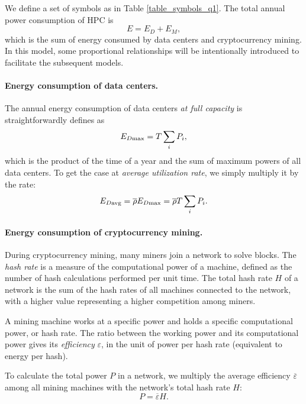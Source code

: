 \documentclass[12pt]{article}
\begin{document}
We define a set of symbols as in Table \ref{table_symbols_q1}. The total annual power consumption of HPC is
\begin{equation}
	E = E_D + E_M,
\end{equation}
which is the sum of energy consumed by data centers and cryptocurrency mining. In this model, some proportional relationships will be intentionally introduced to facilitate the subsequent models.

\paragraph{Energy consumption of data centers.} The annual energy consumption of data centers \textit{at full capacity} is straightforwardly defines as
\begin{equation}
	E_{D \rm max} = T \sum_i P_i,
\end{equation}
which is the product of the time of a year and the sum of maximum powers of all data centers. To get the case at \textit{average utilization rate}, we simply multiply it by the rate:
\begin{equation}
	E_{D \rm avg} = \overline{\rho} E_{D \rm max} = \overline{\rho} T \sum_i P_i.
\end{equation}

\paragraph{Energy consumption of cryptocurrency mining.} During cryptocurrency mining, many miners join a network to solve blocks. The \textit{hash rate} is a measure of the computational power of a machine, defined as the number of hash calculations performed per unit time. The total hash rate $H$ of a network is the sum of the hash rates of all machines connected to the network, with a higher value representing a higher competition among miners.

A mining machine works at a specific power and holds a specific computational power, or hash rate. The ratio between the working power and its computational power gives its \textit{efficiency} $\varepsilon$, in the unit of power per hash rate (equivalent to energy per hash).

To calculate the total power $P$ in a network, we multiply the average efficiency $\overline{\varepsilon}$ among all mining machines with the network's total hash rate $H$:
\begin{equation}
	P = \overline{\varepsilon} H.
	\label{eq_mining_power}
\end{equation}
\end{document}
